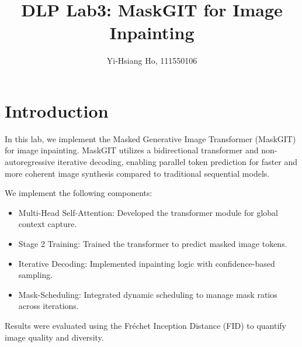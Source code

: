 \documentclass[10pt,twocolumn,letterpaper]{article}
\begin{document}
\title{DLP Lab3: MaskGIT for Image Inpainting}

\author{Yi-Hsiang Ho, 111550106
}
\maketitle



\section{Introduction}
\label{sec:intro}

In this lab, we implement the Masked Generative Image Transformer (MaskGIT)
for image inpainting. MaskGIT utilizes a bidirectional transformer and
non-autoregressive iterative decoding, enabling parallel token prediction for
faster and more coherent image synthesis compared to traditional sequential models.

We implement the following components:

\begin{itemize}[itemsep=0pt]
  \item Multi-Head Self-Attention: Developed the transformer module for global context capture.
  \item Stage 2 Training: Trained the transformer to predict masked image tokens.
  \item Iterative Decoding: Implemented inpainting logic with confidence-based sampling.
  \item Mask-Scheduling: Integrated dynamic scheduling to manage mask ratios across iterations.
\end{itemize}

Results were evaluated using the Fréchet Inception Distance (FID) to quantify
image quality and diversity.


\end{document}
